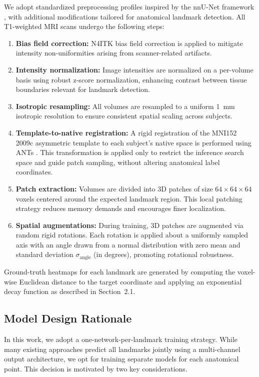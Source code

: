 We adopt standardized preprocessing profiles inspired by the nnU-Net framework \cite{Isensee2021-nnUNet}, with additional modifications tailored for anatomical landmark detection. All T1-weighted MRI scans undergo the following steps:

\begin{enumerate}
    \item \textbf{Bias field correction:} N4ITK bias field correction is applied to mitigate intensity non-uniformities arising from scanner-related artifacts.
    
    \item \textbf{Intensity normalization:} Image intensities are normalized on a per-volume basis using robust z-score normalization, enhancing contrast between tissue boundaries relevant for landmark detection.
    
    \item \textbf{Isotropic resampling:} All volumes are resampled to a uniform 1~mm isotropic resolution to ensure consistent spatial scaling across subjects.
    
    \item \textbf{Template-to-native registration:} A rigid registration of the MNI152 2009c asymmetric template to each subject’s native space is performed using ANTs \cite{Avants2011-ANTs}. This transformation is applied only to restrict the inference search space and guide patch sampling, without altering anatomical label coordinates.
    
    \item \textbf{Patch extraction:} Volumes are divided into 3D patches of size $64 \times 64 \times 64$ voxels centered around the expected landmark region. This local patching strategy reduces memory demands and encourages finer localization.
    
    \item \textbf{Spatial augmentations:} During training, 3D patches are augmented via random rigid rotations. Each rotation is applied about a uniformly sampled axis with an angle drawn from a normal distribution with zero mean and standard deviation $\sigma_{\text{angle}}$ (in degrees), promoting rotational robustness.
\end{enumerate}

Ground-truth heatmaps for each landmark are generated by computing the voxel-wise Euclidean distance to the target coordinate and applying an exponential decay function as described in Section~2.1.

\subsection{Model Design Rationale}
In this work, we adopt a one-network-per-landmark training strategy. While many existing approaches predict all landmarks jointly using a multi-channel output architecture, we opt for training separate models for each anatomical point. This decision is motivated by two key considerations.

